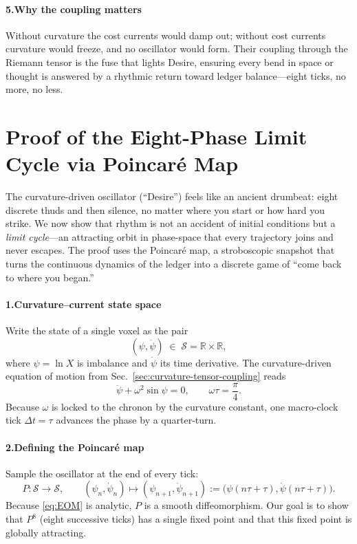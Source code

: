 \documentclass[11pt,oneside]{book}
\begin{document}
\paragraph*{5.\;Why the coupling matters}

Without curvature the cost currents would damp out; without cost
currents curvature would freeze, and no oscillator would form.  
Their coupling through the Riemann tensor is the fuse that lights
Desire, ensuring every bend in space or thought is answered by a rhythmic
return toward ledger balance—eight ticks, no more, no less.

\section{Proof of the Eight-Phase Limit Cycle via Poincaré Map}
\label{sec:limit-cycle-poincare}

The curvature-driven oscillator (“Desire”) feels like an ancient drumbeat: eight discrete thuds and then silence, no matter where you start or how hard you strike.  We now show that rhythm is not an accident of initial conditions but a \emph{limit cycle}—an attracting orbit in phase-space that every trajectory joins and never escapes.  The proof uses the Poincaré map, a stroboscopic snapshot that turns the continuous dynamics of the ledger into a discrete game of “come back to where you began.”

\paragraph*{1.\quad Curvature–current state space}

Write the state of a single voxel as the pair
\[
(\psi,\dot\psi)\;\in\;\mathcal S = \mathbb R \times \mathbb R,
\]
where $\psi=\ln X$ is imbalance and $\dot\psi$ its time derivative.  
The curvature-driven equation of motion from
Sec.~\ref{sec:curvature-tensor-coupling} reads
\[
\ddot\psi + \omega^{2}\sin\psi = 0,
\qquad
\omega\tau = \frac{\pi}{4}.
\tag{EoM}\label{eq:EOM}
\]
Because $\omega$ is locked to the chronon by the curvature constant, one macro-clock tick $\Delta t=\tau$ advances the phase by a quarter-turn.

\paragraph*{2.\quad Defining the Poincaré map}

Sample the oscillator at the end of every tick:
\[
P : \mathcal S \to \mathcal S,
\qquad
(\psi_{n},\dot\psi_{n}) \mapsto (\psi_{n+1},\dot\psi_{n+1})
         :=\bigl(\psi(n\tau+\tau),\dot\psi(n\tau+\tau)\bigr).
\]
Because \eqref{eq:EOM} is analytic, $P$ is a smooth diffeomorphism.  
Our goal is to show that $P^{8}$ (eight successive ticks) has a single fixed point and that this fixed point is globally attracting.
\end{document}
